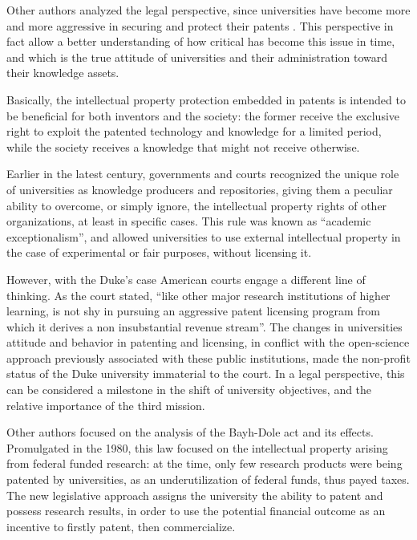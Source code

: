 Other authors analyzed the legal perspective, since universities have become more and more aggressive in securing and protect their patents \citep{Wysocki2004}. This perspective in fact allow a better understanding of how critical has become this issue in time, and which is the true attitude of universities and their administration toward their knowledge assets.

Basically, the intellectual property protection embedded in patents is intended to be beneficial for both inventors and the society: the former receive the exclusive right to exploit the patented technology and knowledge for a limited period, while the society receives a knowledge that might not receive otherwise. 

Earlier in the latest century, governments and courts recognized the unique role of universities as knowledge producers and repositories, giving them a peculiar ability to overcome, or simply ignore, the intellectual property rights of other organizations, at least in specific cases. This rule was known as \enquote{academic exceptionalism}, and allowed universities to use external intellectual property in the case of experimental or fair purposes, without licensing it.

However, with the Duke's case \citep{Hayter2016} American courts engage a different line of thinking. As the court stated, \enquote{like other major research institutions of higher learning, is not shy in pursuing an aggressive patent licensing program from which it derives a non insubstantial revenue stream}. The changes in universities attitude and behavior in patenting and licensing, in conflict with the open-science approach previously associated with these public institutions, made the non-profit status of the Duke university immaterial to the court. In a legal perspective, this can be considered a milestone in the shift of university objectives, and the relative importance of the third mission.

Other authors focused on the analysis of the Bayh-Dole act and its effects. Promulgated in the 1980, this law focused on the intellectual property arising from federal funded research: at the time, only few research products were being patented by universities, as an underutilization of federal funds, thus payed taxes. The new legislative approach assigns the university the ability to patent and possess research results, in order to use the potential financial outcome as an incentive to firstly patent, then commercialize. 

